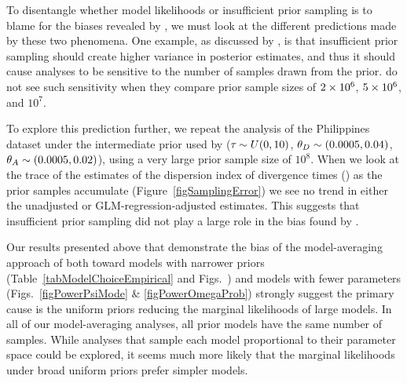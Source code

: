 \documentclass[letterpaper,12pt]{article}
\begin{document}
\begin{linenumbers}
To disentangle whether model likelihoods or insufficient prior sampling is to
blame for the biases revealed by \citet{Oaks2012}, we must look at the
different predictions made by these two phenomena.
One example, as discussed by \citet{Oaks2012}, is that insufficient prior
sampling should create higher variance in posterior estimates, and thus it
should cause analyses to be sensitive to the number of samples drawn from the
prior.
\citet{Oaks2012} do not see such sensitivity when they compare prior sample
sizes of $2\times 10^{6}$, $5\times 10^{6}$, and $10^7$.

To explore this prediction further, we repeat the analysis of the Philippines
dataset under the intermediate prior used by \citet{Oaks2012} ($\tau_{} \sim U(0,
10)$, $\meanDescendantTheta{} \sim (0.0005, 0.04)$, $\ancestralTheta{} \sim
(0.0005, 0.02)$), using a very large prior sample size of $10^8$.
When we look at the trace of the estimates of the dispersion index of
divergence times (\vmratio{}) as the prior samples accumulate
(Figure~\ref{figSamplingError}) we see no trend in either the unadjusted or
GLM-regression-adjusted estimates.
This suggests that insufficient prior sampling did not play a large
role in the bias found by \citet{Oaks2012}.

Our results presented above that demonstrate the bias of the model-averaging
approach of \citet{Hickerson2013} both toward models with narrower \divt{}
priors (Table~\ref{tabModelChoiceEmpirical} and
Figs.~)
and models with fewer \divt{} parameters (Figs.~\ref{figPowerPsiMode} \&
\ref{figPowerOmegaProb}) strongly suggest the primary cause is the uniform
priors reducing the marginal likelihoods of large models.
In all of our model-averaging analyses, all prior models have the same number
of samples.
While analyses that sample each model proportional to their parameter space
could be explored, it seems much more likely that the marginal likelihoods
under broad uniform priors prefer simpler models.


\end{linenumbers}
\end{document}
